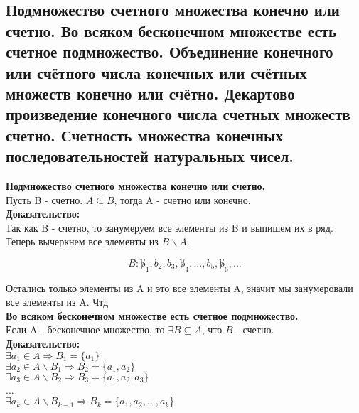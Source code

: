 \subsection{Подмножество счетного множества конечно или счетно. Во всяком бесконечном множестве есть счетное подмножество. Объединение конечного или счётного числа конечных или счётных множеств конечно или счётно. Декартово произведение конечного числа счетных множеств счетно. Счетность множества конечных последовательностей натуральных чисел.}

\textbf{Подмножество счетного множества конечно или счетно.}\\

Пусть B - счетно. $A \subseteq B$, тогда A - счетно или конечно.\\

\noindent \textbf{Доказательство:} \\

Так как B - счетно, то занумеруем все элементы из B и выпишем их в ряд. Теперь вычеркнем все элементы из $B \backslash A$.

\begin{equation*}
    B : \not b_1, b_2, b_3, \not b_4, ..., b_5, \not b_6, ...
\end{equation*}

Остались только элементы из A и это все элементы A, значит мы занумеровали все элементы из A. Чтд\\

\textbf{Во всяком бесконечном множестве есть счетное подмножество.}\\

Если A - бесконечное множество, то $\exists B \subseteq A$, что $B$ - счетно.\\

\noindent \textbf{Доказательство:}\\

$\exists a_1 \in A \Rightarrow B_1 = \{a_1\}$\\

$\exists a_2 \in A \backslash B_1 \Rightarrow B_2 = \{a_1, a_2\}$\\

$\exists a_3 \in A \backslash B_2 \Rightarrow B_3 = \{a_1, a_2, a_3\}$\\

...\\

$\exists a_k \in A \backslash B_{k - 1} \Rightarrow B_k = \{a_1, a_2, ..., a_k\}$\\

